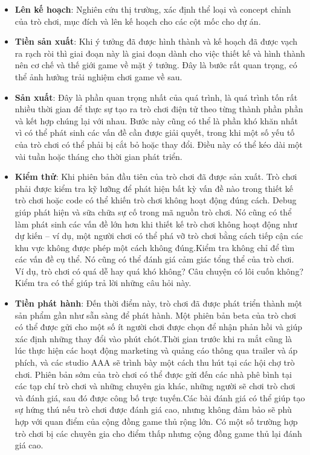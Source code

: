 \begin{itemize}
	\item \textbf{Lên kế hoạch}: Nghiên cứu thị trường, xác định thể loại và concept chỉnh của trò chơi, mục đích và lên kế hoạch cho các cột mốc cho dự án.
	\item \textbf{Tiền sản xuất}: Khi ý tưởng đã được hình thành và kế hoạch đã được vạch ra rạch ròi thì giai đoạn này là giai đoạn dành cho việc thiết kế và hình thành nên cơ chế và thế giới game về mặt ý tưởng. Đây là bước rất quan trọng, có thể ảnh hưởng trải nghiệm chơi game về sau.
	\item \textbf{Sản xuất}: Đây là phần quan trọng nhất của quá trình, là quá trình tốn rất nhiều thời gian để thực sự tạo ra trò chơi điện tử theo từng thành phần phần và kết hợp chúng lại với nhau. Bước này cũng có thể là phần khó khăn nhất vì có thể phát sinh các vấn đề cần được giải quyết, trong khi một số yếu tố của trò chơi có thể phải bị cắt bỏ hoặc thay đổi. Điều này có thể kéo dài một vài tuần hoặc tháng cho thời gian phát triển.
	\item \textbf{Kiểm thử}: Khi phiên bản đầu tiên của trò chơi đã được sản xuất. Trò chơi phải được kiểm tra kỹ lưỡng để phát hiện bất kỳ vấn đề nào trong thiết kế trò chơi hoặc code có thể khiến trò chơi không hoạt động đúng cách. Debug giúp phát hiện và sữa chữa sự cố trong mã nguồn trò chơi. Nó cũng có thể làm phát sinh các vấn đề lớn hơn khi thiết kế trò chơi không hoạt động như dự kiến – ví dụ, một người chơi có thể phá vỡ trò chơi bằng cách tiếp cận các khu vực không được phép một cách không đúng.Kiểm tra không chỉ để tìm các vấn đề cụ thể. Nó cũng có thể đánh giá cảm giác tổng thể của trò chơi. Ví dụ, trò chơi có quá dễ hay quá khó không? Câu chuyện có lôi cuốn không? Kiểm tra có thể giúp trả lời những câu hỏi này.
	\item \textbf{Tiền phát hành}: Đến thời điểm này, trò chơi đã được phát triển thành một sản phẩm gần như sẵn sàng để phát hành. Một phiên bản beta của trò chơi có thể được gửi cho một số ít người chơi được chọn để nhận phản hồi và giúp xác định những thay đổi vào phút chót.Thời gian trước khi ra mắt cũng là lúc thực hiện các hoạt động marketing và quảng cáo thông qua trailer và áp phích, và các studio AAA sẽ trình bày một cách thu hút tại các hội chợ trò chơi. Phiên bản sớm của trò chơi có thể được gửi đến các nhà phê bình tại các tạp chí trò chơi và những chuyên gia khác, những người sẽ chơi trò chơi và đánh giá, sau đó được công bố trực tuyến.Các bài đánh giá có thể giúp tạo sự hứng thú nếu trò chơi được đánh giá cao, nhưng không đảm bảo sẽ phù hợp với quan điểm của cộng đồng game thủ rộng lớn. Có một số trường hợp trò chơi bị các chuyên gia cho điểm thấp nhưng cộng đồng game thủ lại đánh giá cao.

\end{itemize}
